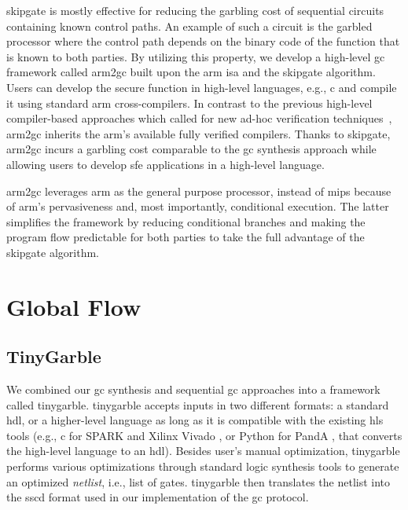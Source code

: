 \gls{skipgate} is mostly effective for reducing the garbling cost of sequential circuits containing known control paths.
An example of such a circuit is the garbled processor where the control path depends on the binary code of the function that is known to both parties.
By utilizing this property, we develop a high-level \acrshort{gc} framework called \gls{arm2gc} built upon the \gls{arm} \acrshort{isa} and the \gls{skipgate} algorithm.
Users can develop the secure function in high-level languages, e.g., \gls{c} and compile it using standard \gls{arm} cross-compilers.
In contrast to the previous high-level compiler-based approaches which called for new ad-hoc verification techniques~\cite{rastogi2014wysteria,demmler2015aby,liu2015oblivm,mood2016frigate}, \gls{arm2gc} inherits the \gls{arm}'s available fully verified compilers.
Thanks to \gls{skipgate}, \gls{arm2gc} incurs a garbling cost comparable to the \acrshort{gc} synthesis approach while allowing users to develop \acrshort{sfe} applications in a high-level language.

\gls{arm2gc} leverages \gls{arm} as the general purpose processor, instead of \gls{mips} because of \gls{arm}'s pervasiveness and, most importantly, conditional execution.
The latter simplifies the framework by reducing conditional branches and making the program flow predictable for both parties to take the full advantage of the \gls{skipgate} algorithm.

\section{Global Flow}
\subsection{TinyGarble}
We combined our \acrshort{gc} synthesis and sequential \acrshort{gc} approaches into a framework called \gls{tinygarble}.
\gls{tinygarble} accepts inputs in two different formats: a standard \acrfull{hdl}, or a higher-level language as long as it is compatible with the existing \acrfull{hls} tools (e.g., \gls{c} for  SPARK \cite{Gupta2004} and Xilinx Vivado \cite{tool:Vivado}, or Python for PandA \cite{tool:PandA}, that converts the high-level language to an \acrshort{hdl}).
Besides user's manual optimization, \gls{tinygarble} performs various optimizations through standard logic synthesis tools to generate an optimized \textit{\gls{netlist}}, i.e., list of gates.
\gls{tinygarble} then translates the \gls{netlist} into the \acrfull{sscd} format used in our implementation of the \acrshort{gc} protocol.

